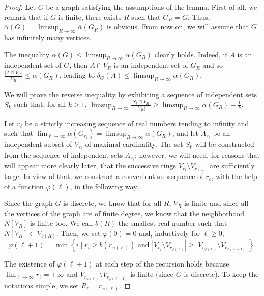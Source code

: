 \documentclass{amsart}                     %
\begin{document}
\begin{proof} Let $G$ be a graph satisfying the assumptions of the lemma. First of all, we remark that
if $G$ is finite, there exists $R$ such that $G_R=G$. Thus, $\overline{\alpha}(G)= \limsup_{R\to\infty}\overline{\alpha} (G_R)$ is obvious.
From now on, we will assume that $G$ has infinitely many vertices.

The inequality $\overline{\alpha}(G)\leq \limsup_{R\to\infty}\overline{\alpha} (G_R)$ clearly holds. Indeed, if $A$ is an independent set of $G$, then $A\cap V_R$ is an independent set of $G_R$ and so $\frac{|A\cap V_R|}{|V_R|}\leq \overline{\alpha}(G_R)$, leading to
$\delta_G(A)\leq \limsup_{R\to\infty}\overline{\alpha}(G_R)$.

We will  prove the reverse inequality by exhibiting a sequence of independent sets $S_k$ such that, for all $k\geq 1$, $\limsup_{R\to\infty} \frac{|S_k\cap V_R|}{|V_R|}\geq \limsup_{R\to\infty}\overline{\alpha} (G_R) -\frac 1 k$.

Let $r_\ell$ be a strictly increasing sequence of real numbers tending to infinity and such that 
$\lim_{\ell\to\infty} \overline{\alpha}(G_{r_\ell})=\limsup_{R\to\infty}\overline{\alpha} (G_R)$, and let $A_{r_\ell}$ be an independent subset of $V_{r_\ell}$ of maximal cardinality. The set $S_k$ will be constructed from the
sequence of independent sets $A_{r_\ell}$; however, we will need, for reasons that will appear more clearly later, that the successive rings $V_{r_\ell}\setminus V_{r_{\ell-1}}$ are sufficiently large. In view of that, we construct a convenient subsequence 
of $r_\ell$, with the help of a function $\varphi(\ell)$, in the following way. 

Since the graph $G$ is discrete, we know that for all $R$, $V_R$ is finite and since all the vertices of the graph are of finite degree, we know that the neighborhood $N[V_R]$ is finite too. We call $b(R)$ the smallest real number such that $N[V_R]\subset V_{b(R)}$. Then, we set $\varphi(0)=0$ and, inductively for $\ell\geq 0$,
\[
\varphi(\ell+1)=\min\left\{i\mid r_{i}\geq b(r_{\varphi(\ell)})\text{ and }|V_{r_{i}}\setminus V_{r_{\varphi(\ell)}}|\geq |V_{r_{\varphi(\ell)}}\setminus V_{r_{\varphi(\ell-1)}}|\right\}.\]



The existence of $\varphi(\ell+1)$ at each step of the recursion holds because $\lim_{\ell\to\infty} r_\ell=+\infty$ and  $V_{r_{\varphi(\ell)}}\setminus V_{r_{\varphi(\ell-1)}}$ is finite (since $G$ is discrete). To keep the notations simple, we set $R_\ell=r_{\varphi(\ell)}$.



\end{proof}
\end{document}
